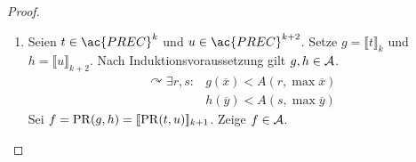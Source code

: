 \begin{proof}
\begin{enumerate}
\begin{align*}
			&\le A(s,\max(g_1(\overline{x}),\dots,g_m(\overline{x})))\\
			&< A(s,\max(A(r_1,\max\overline{x}), \dots, A(r_m,\max\overline{x})))\\
			&= A(s,A(s+1,\max\overline{x}))\\
			&= A(s+1,\max\overline{x} + 1)\\
			&\le A(\underline{s+2},\max\overline{x})\\
			\text{Also }f\in\A.
		\end{align*}
	\item Seien $t\in\ac{PREC}^k$ und $u\in\ac{PREC}^{k+2}$. Setze
		$g=\llbracket t\rrbracket_k$ und $h=\llbracket u\rrbracket_{k+2}$.
		Nach Induktionsvoraussetzung gilt $g,h\in\mathcal{A}$.
		\begin{align*}
			\curvearrowright \exists r,s :{}& g(\overline{x})< A(r,\max\overline{x})\\
                                                        & h(\overline{y})< A(s,\max\overline{y})
		\end{align*}
		Sei $f=\operatorname{PR}(g,h)=[\![ \operatorname{PR}(t,u)]\!]_{k+1}$.
		Zeige $f\in\mathcal{A}$.\\


		


\end{enumerate}
\end{proof}

